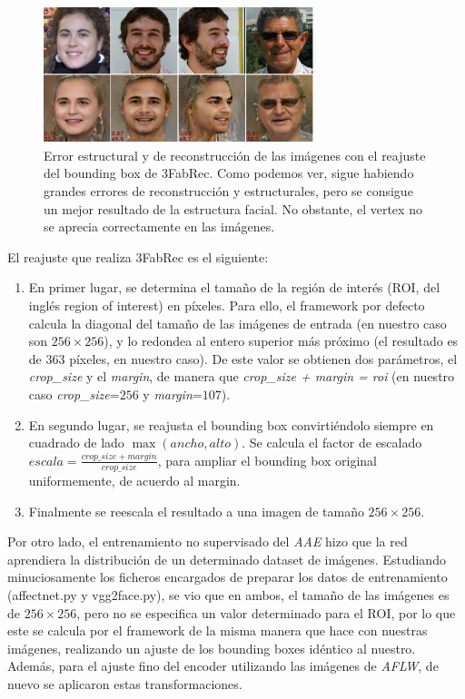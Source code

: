             \begin{figure}[!h]
                \centering
                \includegraphics[width=0.7\textwidth]{img/bounding_box_3fabrec.png}
                \caption{Error estructural y de reconstrucción de las imágenes con el reajuste del bounding box de 3FabRec. Como podemos ver, sigue habiendo grandes errores de reconstrucción y estructurales, pero se consigue un mejor resultado de la estructura facial. No obstante, el vertex no se aprecia correctamente en las imágenes.}
                \label{fig:bb_3fabrec}
            \end{figure}

            \noindent El reajuste que realiza 3FabRec es el siguiente:
            \begin{enumerate}
                \item En primer lugar, se determina el tamaño de la región de interés (ROI, del inglés region of interest) en píxeles. Para ello, el framework por defecto calcula la diagonal del tamaño de las imágenes de entrada (en nuestro caso son $256 \times 256$), y lo redondea al entero superior más próximo (el resultado es de $363$ píxeles, en nuestro caso). De este valor se obtienen dos parámetros, el \textit{crop\_size} y el \textit{margin}, de manera que \textit{crop\_size + margin = roi} (en nuestro caso \textit{crop\_size}=$256$ y \textit{margin}=$107$).
                \item En segundo lugar, se reajusta el bounding box convirtiéndolo siempre en cuadrado de lado $\max(ancho,alto)$. Se calcula el factor de escalado $escala = \frac{crop\_size + margin}{crop\_size}$, para ampliar el bounding box original uniformemente, de acuerdo al margin. 
                \item  Finalmente se reescala el resultado a una imagen de tamaño $256\times 256$.
            \end{enumerate}

            \medskip

            \noindent Por otro lado, el entrenamiento no supervisado del \textit{AAE} hizo que la red aprendiera la distribución de un determinado dataset de imágenes. Estudiando minuciosamente los ficheros encargados de preparar los datos de entrenamiento (affectnet.py y vgg2face.py), se vio que en ambos, el tamaño de las imágenes es de $256 \times 256$, pero no se especifica un valor determinado para el ROI, por lo que este se calcula por el framework de la misma manera que hace con nuestras imágenes, realizando un ajuste de los bounding boxes idéntico al nuestro. Además, para el ajuste fino del encoder utilizando las imágenes de \textit{AFLW}, de nuevo se aplicaron estas transformaciones.
            
